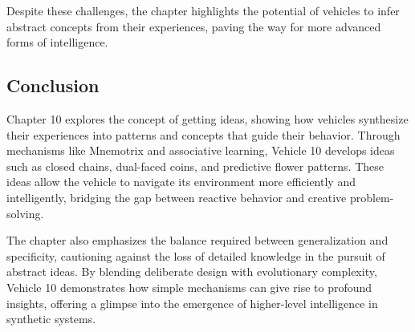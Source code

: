 \documentclass{article}
\begin{document}
	Despite these challenges, the chapter highlights the potential of vehicles to infer abstract concepts from their experiences, paving the way for more advanced forms of intelligence.

	\subsection*{Conclusion}

	Chapter 10 explores the concept of getting ideas, showing how vehicles synthesize their experiences into patterns and concepts that guide their behavior. Through mechanisms like Mnemotrix and associative learning, Vehicle 10 develops ideas such as closed chains, dual-faced coins, and predictive flower patterns. These ideas allow the vehicle to navigate its environment more efficiently and intelligently, bridging the gap between reactive behavior and creative problem-solving.

	The chapter also emphasizes the balance required between generalization and specificity, cautioning against the loss of detailed knowledge in the pursuit of abstract ideas. By blending deliberate design with evolutionary complexity, Vehicle 10 demonstrates how simple mechanisms can give rise to profound insights, offering a glimpse into the emergence of higher-level intelligence in synthetic systems.
	
\end{document}
